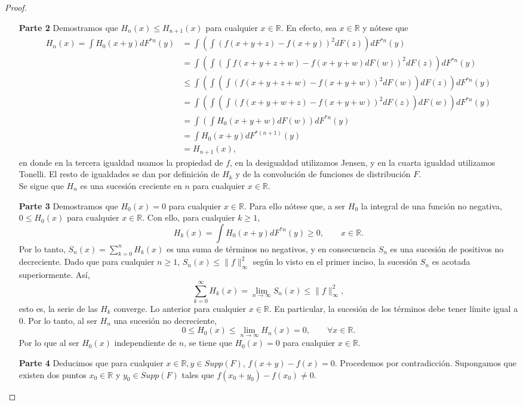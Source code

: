 \documentclass[letterpaper]{article}
\newcommand{\R}{\mathbb{R}}
\renewcommand{\to}{\rightarrow}
\newcommand{\1}{\mathds{1}}
\theoremstyle{definition}
\theoremstyle{definition}
\theoremstyle{definition}
\theoremstyle{definition}
\theoremstyle{definition}
\begin{document}
\begin{proof}
\begin{enumerate}
    \item[\textbf{Parte 2}] Demostramos que $H_n(x)\leq H_{n+1}(x)$ para cualquier $x\in \R$.
    En efecto, sea $x\in \R$ y nótese que 
    \begin{align*}
      H_{n}(x)=\int H_0(x+y)dF^{*n}(y)&=\int \left(\int \left(f(x+y+z)-f(x+y)\right)^2dF(z)\right)dF^{*n}(y)\\
      &=\int \left(\int \left(\int f(x+y+z+w)-f(x+y+w)dF(w)\right)^2dF(z)\right)dF^{*n}(y)\\
      &\leq \int \left(\int \left(\int (f(x+y+z+w)-f(x+y+w))^2dF(w)\right)dF(z)\right)dF^{*n}(y)\\
      &=\int \left(\int \left(\int (f(x+y+w+z)-f(x+y+w))^2dF(z)\right)dF(w)\right)dF^{*n}(y)\\
      &=\int \left(\int H_0(x+y+w)dF(w)\right)dF^{*n}(y)\\
      &=\int H_0(x+y)dF^{*(n+1)}(y)\\
      &=H_{n+1}(x),
    \end{align*}
    en donde en la tercera igualdad usamos la propiedad de $f$, en la desigualdad utilizamos Jensen, y en la cuarta igualdad utilizamos Tonelli. El resto de igualdades se dan por definición de $H_k$ y de la convolución de funciones de distribución $F$.\\

    Se sigue que $H_n$ es una sucesión creciente en $n$ para cualquier $x\in \R$.
    \item[\textbf{Parte 3}] Demostramos que $H_0(x)=0$ para cualquier $x\in \R$. Para ello nótese que, a ser $H_0$ la integral de una función no negativa, $0\leq H_0(x)$ para cualquier $x\in \R$. Con ello, para cualquier $k\geq1$, 
    \[
    H_k(x)=\int H_0(x+y)dF^{*n}(y)\geq0, \qquad  x\in \R.   
    \]
    Por lo tanto, $S_n(x)=\displaystyle\sum_{k=0}^{n}H_k(x)$ es una suma de términos no negativos, y en consecuencia $S_n$ es una sucesión de positivos no decreciente. Dado que para cualquier $n\geq1$, $S_n(x)\leq \|f\|_{\infty}^2$ según lo visto en el primer inciso, la sucesión $S_n$ es acotada superiormente. Así, 
    \[
    \sum_{k=0}^{\infty}H_k(x)=\lim_{n\to \infty}S_n(x)\leq \|f\|_{\infty}^2,  
    \]
    esto es, la serie de las $H_k$ converge. Lo anterior para cualquier $x\in \R$. En particular, la sucesión de los términos debe tener límite igual a 0. Por lo tanto, al ser $H_n$ una sucesión no decreciente,
    \[
    0\leq H_0(x)\leq\lim_{n\to \infty}H_n(x)=0, \qquad \forall x \in \R.  
    \]
    Por lo que al ser $H_0(x)$ independiente de $n$, se tiene que $H_0(x)=0$ para cualquier $x \in \R$.
    \item[\textbf{Parte 4}] Deducimos que para cualquier $x\in \R, y\in Supp(F)$, $f(x+y)-f(x)=0$. Procedemos por contradicción. Supongamos que existen dos puntos $x_0\in \R$ y $y_0\in Supp(F)$ tales que $f(x_0+y_0)-f(x_0)\neq 0$.\\
    

\end{enumerate}
\end{proof}
\end{document}
